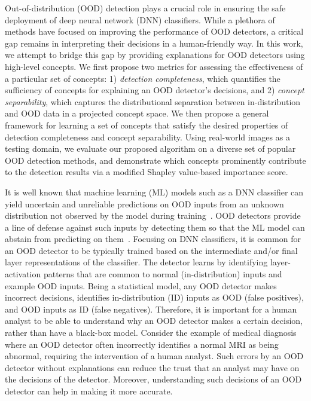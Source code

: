 

Out-of-distribution (OOD) detection plays a crucial role in ensuring the safe deployment of deep neural network (DNN) classifiers. %
While a plethora of methods have focused on improving the performance of OOD detectors, a critical gap remains in interpreting their decisions in a human-friendly way.
In this work, we attempt to bridge this gap by providing explanations for OOD detectors using high-level concepts.
We first propose two metrics for assessing the effectiveness of a particular set of concepts: 1) \textit{detection completeness}, which quantifies the sufficiency of concepts for explaining an OOD detector's decisions, and 2) \textit{concept separability}, which captures the distributional separation between in-distribution and OOD data in a projected concept space.
We then propose a general framework for learning a set of concepts that satisfy the desired properties of detection completeness and concept separability.
Using real-world images as a testing domain, we evaluate our proposed algorithm on a diverse set of popular OOD detection methods, and demonstrate which concepts prominently contribute to the detection results via a modified Shapley value-based importance score.





It is well known that machine learning (ML) models such as a DNN classifier can yield uncertain and unreliable predictions on OOD inputs from an unknown distribution not observed by the model during training~\cite{amodei2016AISafety,goodfellow2015explaining,nguyen2015posterior}.
OOD detectors provide a line of defense against such inputs by detecting them so that the ML model can abstain from predicting on them~\cite{hendrycks2018OE,lin2021MOOD,mohseni2020self}.
Focusing on DNN classifiers, it is common for an OOD detector to be typically trained based on the intermediate and/or final layer representations of the classifier.
The detector learns by identifying layer-activation patterns that are common to normal (in-distribution) inputs and example OOD inputs.
Being a statistical model, any OOD detector makes incorrect decisions, \ie identifies in-distribution (ID) inputs as OOD (false positives), and OOD inputs as ID (false negatives).
Therefore, it is important for a human analyst to be able to understand why an OOD detector makes a certain decision, rather than have a black-box model.
Consider the example of medical diagnosis where an OOD detector often incorrectly identifies a normal MRI as being abnormal, requiring the intervention of a human analyst.
Such errors by an OOD detector without explanations can reduce the trust that an analyst may have on the decisions of the detector. 
Moreover, understanding such decisions of an OOD detector can help in making it more accurate.

